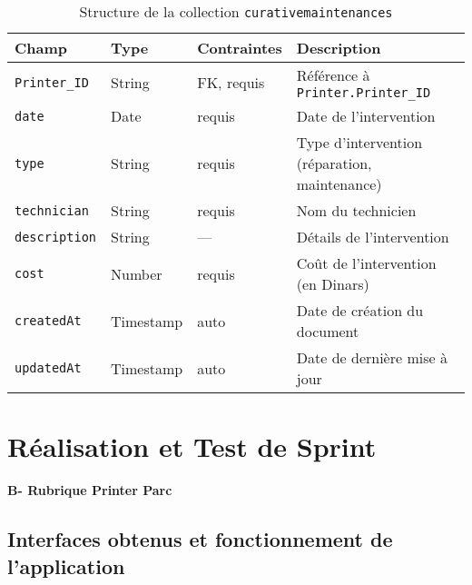\documentclass[a4paper,11pt]{report}
\begin{document}
\begin{table}[ht]
  \centering
  \small
  \caption{Structure de la collection \texttt{curativemaintenances}}
  \label{tab:curative-schema}
  \begin{tabularx}{\textwidth}{l X l X}
    \toprule
    \bf Champ            & \bf Type      & \bf Contraintes         & \bf Description                              \\
    \midrule
    \texttt{Printer\_ID}       & String       & FK, requis             & Référence à \texttt{Printer.Printer\_ID}      \\
    \addlinespace
    \texttt{date}        & Date         & requis                 & Date de l’intervention                        \\
    \addlinespace
    \texttt{type}        & String       & requis                 & Type d’intervention (réparation, maintenance) \\
    \addlinespace
    \texttt{technician}  & String       & requis                 & Nom du technicien                             \\
    \addlinespace
    \texttt{description} & String       & —                       & Détails de l’intervention                      \\
    \addlinespace
    \texttt{cost}        & Number       & requis                 & Coût de l’intervention (en Dinars)             \\
    \addlinespace
    \texttt{createdAt}   & Timestamp    & auto                    & Date de création du document                   \\
    \addlinespace
    \texttt{updatedAt}   & Timestamp    & auto                    & Date de dernière mise à jour                   \\
    \bottomrule
  \end{tabularx}
\end{table}

\section{Réalisation et Test de Sprint}

\textbf{B- Rubrique Printer Parc}

\subsection{Interfaces obtenus et fonctionnement de l'application}
\end{document}
